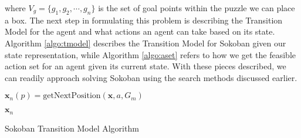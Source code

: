 \documentclass{article}[12pt]
\begin{document}
   where $V_g = \lbrace g_1, g_2, \cdots, g_n\rbrace$ is the set of goal points within the puzzle we can place a box. The next step in formulating this problem is describing the Transition Model for the agent and what actions an agent can take based on its state. Algorithm \ref{algo:tmodel} describes the Transition Model for Sokoban given our state representation, while Algorithm \ref{algo:aset} refers to how we get the feasible action set for an agent given its current state. With these pieces described, we can readily approach solving Sokoban using the search methods discussed earlier.
   
	\begin{algorithm}[H]
		 \;
		 
		 \;
		 
		 $\boldsymbol{x}_n(p) =  \text{getNextPosition}\left(\boldsymbol{x},a,G_m\right)$
		 \;
		 \;
		 
		 \;
		 \Return $\boldsymbol{x}_n$
		 \caption{Sokoban Transition Model Algorithm}
		 \label{algo:tmodel}
	\end{algorithm}	
	
\end{document}
